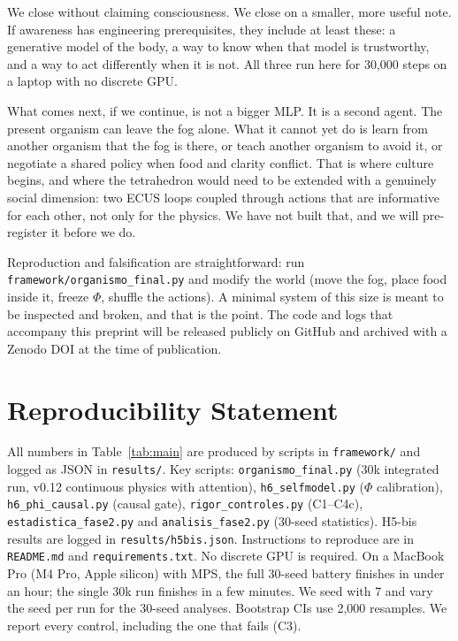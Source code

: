\documentclass[11pt,a4paper]{article}
\begin{document}
We close without claiming consciousness. We close on a smaller, more useful note. If awareness has engineering prerequisites, they include at least these: a generative model of the body, a way to know when that model is trustworthy, and a way to act differently when it is not. All three run here for 30,000 steps on a laptop with no discrete GPU.

What comes next, if we continue, is not a bigger MLP. It is a second agent. The present organism can leave the fog alone. What it cannot yet do is learn from another organism that the fog is there, or teach another organism to avoid it, or negotiate a shared policy when food and clarity conflict. That is where culture begins, and where the tetrahedron would need to be extended with a genuinely social dimension: two ECUS loops coupled through actions that are informative for each other, not only for the physics. We have not built that, and we will pre-register it before we do.

Reproduction and falsification are straightforward: run \texttt{framework/organismo\_final.py} and modify the world (move the fog, place food inside it, freeze $\Phi$, shuffle the actions). A minimal system of this size is meant to be inspected and broken, and that is the point. The code and logs that accompany this preprint will be released publicly on GitHub and archived with a Zenodo DOI at the time of publication.

\section{Reproducibility Statement}

All numbers in Table~\ref{tab:main} are produced by scripts in \texttt{framework/} and logged as JSON in \texttt{results/}. Key scripts: \texttt{organismo\_final.py} (30k integrated run, v0.12 continuous physics with attention), \texttt{h6\_selfmodel.py} ($\Phi$ calibration), \texttt{h6\_phi\_causal.py} (causal gate), \texttt{rigor\_controles.py} (C1--C4c), \texttt{estadistica\_fase2.py} and \texttt{analisis\_fase2.py} (30-seed statistics). H5-bis results are logged in \texttt{results/h5bis.json}. Instructions to reproduce are in \texttt{README.md} and \texttt{requirements.txt}. No discrete GPU is required. On a MacBook Pro (M4 Pro, Apple silicon) with MPS, the full 30-seed battery finishes in under an hour; the single 30k run finishes in a few minutes. We seed with 7 and vary the seed per run for the 30-seed analyses. Bootstrap CIs use 2,000 resamples. We report every control, including the one that fails (C3).
\end{document}
